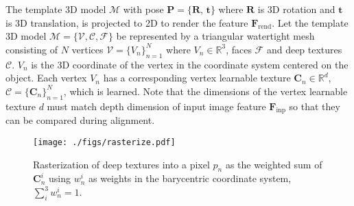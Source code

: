 \documentclass[10pt,twocolumn,letterpaper]{article}
\begin{document}
The template 3D model $\mathcal{M}$ with pose $\mathbf{P} = \{ \mathbf{R}$,  $\mathbf{t} \}$ where $\mathbf{R}$ is 3D rotation and $\mathbf{t}$ is 3D translation, is projected to 2D to render the feature $\mathbf{F}_\text{rend}$. Let the template 3D model $\mathcal{M}=\{ \mathcal{V},\mathcal{C}, \mathcal{F} \}$ be represented by a triangular watertight mesh consisting of $N$ vertices $\mathcal{V} = \{ V_n \}^N_{n=1}$ where $V_n \in \mathbb{R}^{3}$, faces $\mathcal{F}$ and deep textures $\mathcal{C}$. $V_n$ is the 3D coordinate of the vertex in the coordinate system centered on the object. Each vertex $V_n$ has a corresponding vertex learnable texture $\mathbf{C}_n \in \mathbb{R}^{d}$, $\mathcal{C} = \{ \mathbf{C}_n \}^N_{n=1}$, which is learned. Note that the dimensions of the vertex learnable texture $d$ must match depth dimension of input image feature $\mathbf{F}_\text{inp}$ so that they can be compared during alignment.

\begin{figure}[t]
  \centering
  \texttt{[image: ./figs/rasterize.pdf]}
  \caption{Rasterization of deep textures into a pixel $p_n$ as the weighted sum of $\mathbf{C}^i_n$ using $w^i_n$ as weights in the barycentric coordinate system, $\sum_i^3 w^i_n = 1$.}
  \label{fig:rasterize}
\end{figure}
\end{document}
